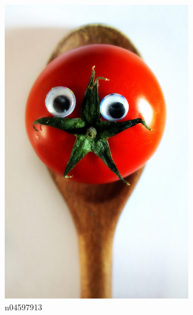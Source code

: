 \documentclass[11pt, a4paper]{article}
\begin{document}
\begin{figure}[htb]
    \begin{subfigure}[b]{0.30\textwidth}
    		\centering
        \includegraphics[width=\textwidth]{imagenet/examples/n04597913_10021.JPEG}
        \caption{n04597913}
        \label{fig:imagenet-examples-4}
    \end{subfigure}
    ~ %
    \begin{subfigure}[b]{0.30\textwidth}
    		\centering

\end{subfigure}
\end{figure}
\end{document}
